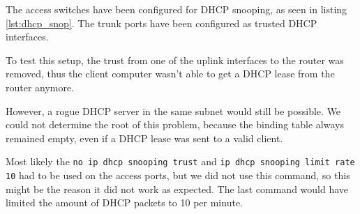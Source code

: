 The access switches have been configured for DHCP snooping, as seen in listing \ref{lst:dhcp_snop}. The trunk ports have been configured as trusted DHCP interfaces.

To test this setup, the trust from one of the uplink interfaces to the router was removed, thus the client computer wasn't able to get a DHCP lease from the router anymore.

However, a rogue DHCP server in the same subnet would still be possible. We could not determine the root of this problem, because the binding table always remained empty, even if a DHCP lease was sent to a valid client.

Most likely the \texttt{no ip dhcp snooping trust} and \texttt{ip dhcp snooping limit rate 10} had to be used on the access ports, but we did not use this command, so this might be the reason it did not work as expected. The last command would have limited the amount of DHCP packets to 10 per minute.


